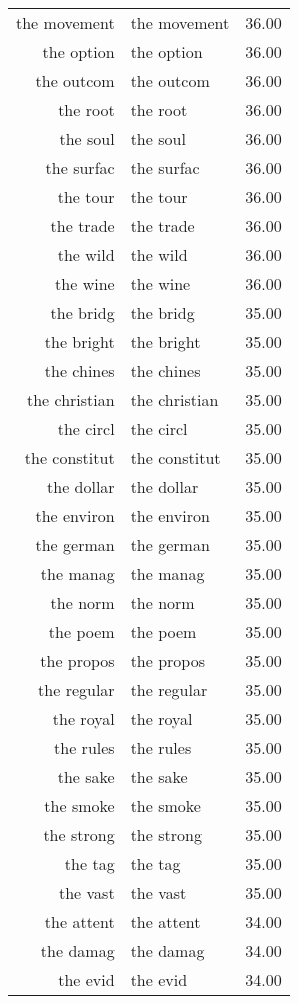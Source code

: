 \begin{table}[ht]
\begin{tabular}{rlr}
  the movement & the movement & 36.00 \\ 
  the option & the option & 36.00 \\ 
  the outcom & the outcom & 36.00 \\ 
  the root & the root & 36.00 \\ 
  the soul & the soul & 36.00 \\ 
  the surfac & the surfac & 36.00 \\ 
  the tour & the tour & 36.00 \\ 
  the trade & the trade & 36.00 \\ 
  the wild & the wild & 36.00 \\ 
  the wine & the wine & 36.00 \\ 
  the bridg & the bridg & 35.00 \\ 
  the bright & the bright & 35.00 \\ 
  the chines & the chines & 35.00 \\ 
  the christian & the christian & 35.00 \\ 
  the circl & the circl & 35.00 \\ 
  the constitut & the constitut & 35.00 \\ 
  the dollar & the dollar & 35.00 \\ 
  the environ & the environ & 35.00 \\ 
  the german & the german & 35.00 \\ 
  the manag & the manag & 35.00 \\ 
  the norm & the norm & 35.00 \\ 
  the poem & the poem & 35.00 \\ 
  the propos & the propos & 35.00 \\ 
  the regular & the regular & 35.00 \\ 
  the royal & the royal & 35.00 \\ 
  the rules & the rules & 35.00 \\ 
  the sake & the sake & 35.00 \\ 
  the smoke & the smoke & 35.00 \\ 
  the strong & the strong & 35.00 \\ 
  the tag & the tag & 35.00 \\ 
  the vast & the vast & 35.00 \\ 
  the attent & the attent & 34.00 \\ 
  the damag & the damag & 34.00 \\ 
  the evid & the evid & 34.00 \\ 

\end{tabular}
\end{table}
